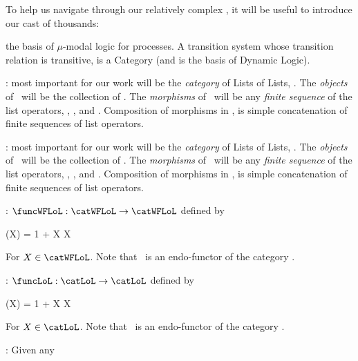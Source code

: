 To help us navigate through our relatively complex , it will 
be useful to introduce our cast of thousands: 

\startitemize[n]

\item {} the basis of $\mu$-modal logic for 
processes. A transition system whose transition relation is transitive, is 
a Category (and is the basis of Dynamic Logic). 

\item {} 

\item {}: most important for our work will be 
the \emph{category} of Lists of Lists, \catWFLoL. The \emph{objects} of 
\catWFLoL\ will be the collection of \wflols. The \emph{morphisms} of 
\catWFLoL\ will be any \emph{finite sequence} of the list operators, 
, ,  and . Composition of 
morphisms in \catWFLoL, is simple concatenation of finite sequences of list 
operators. 

\item {}: most important for our work will be 
the \emph{category} of Lists of Lists, \catLoL. The \emph{objects} of 
\catLoL\ will be the collection of \lols. The \emph{morphisms} of 
\catLoL\ will be any \emph{finite sequence} of the list operators, 
, ,  and . Composition of 
morphisms in \catLoL, is simple concatenation of finite sequences of list 
operators. 

\item {}: $\funcWFLoL : \catWFLoL \rightarrow \catWFLoL$ 
defined by 

\placeformula[+]\startformula
  \funcWFLoL(X) = 1 + X \times X
\stopformula

\noindent For $X \in \catWFLoL$. Note that \funcWFLoL\ is an endo-functor of 
the category \catWFLoL. 

\item {}: $\funcLoL : \catLoL \rightarrow \catLoL$ 
defined by 

\placeformula[+]\startformula
  \funcLoL(X) = 1 + X \times X
\stopformula

\noindent For $X \in \catLoL$. Note that \funcLoL\ is an endo-functor of 
the category \catLoL. 

\item {}: Given any 

